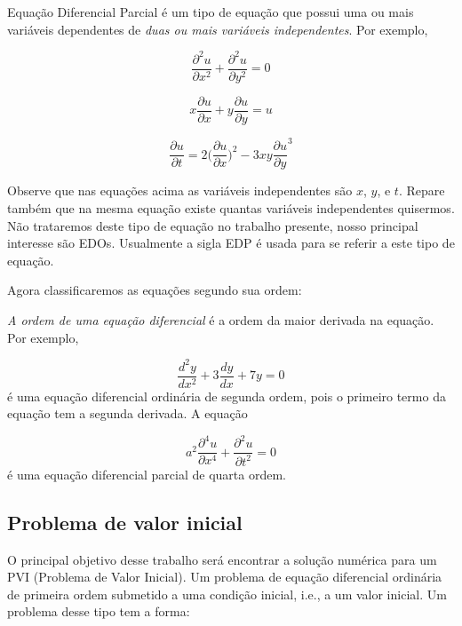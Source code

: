 Equação Diferencial Parcial é um tipo de equação que 
possui uma ou mais variáveis dependentes de 
\emph{duas ou mais variáveis independentes}. Por exemplo,

\begin{equation*}
\frac{\partial^{2}u}{\partial x^{2}} + \frac{\partial^{2}u}{\partial y^{2}} = 0
\end{equation*}


\begin{equation*}
x\frac{\partial u}{\partial x} + y\frac{\partial u}{\partial y} = u
\end{equation*}


\begin{equation*}
\frac{\partial u}{\partial t} = 2\biggl(\frac{\partial u}{\partial x}\biggl)^{2} - 3xy\frac{\partial u}{\partial y}^{3}
\end{equation*}

Observe que nas equações acima as variáveis independentes
são $x$, $y$, e $t$. Repare também que na mesma equação existe quantas variáveis
independentes quisermos. Não trataremos deste tipo de equação no trabalho presente,
nosso principal interesse são EDOs. Usualmente a sigla EDP é usada para se referir a este tipo de equação.

Agora classificaremos as equações segundo sua ordem:

\emph{A ordem de uma equação diferencial} é a ordem da maior derivada na equação. Por exemplo,

\begin{equation*}
\frac{d^{2}y}{dx^{2}} + 3\frac{dy}{dx} + 7y = 0
\end{equation*}
é uma equação diferencial ordinária de segunda ordem, pois o primeiro termo
da equação tem a segunda derivada. A equação

\begin{equation*}
a^{2}\frac{\partial^{4}u}{\partial x^{4}} + \frac{\partial^2u}{\partial t^{2}} = 0
\end{equation*}
é uma equação diferencial parcial de quarta ordem.

\subsection{Problema de valor inicial}

O principal objetivo desse trabalho será encontrar a solução numérica para um
PVI (Problema de Valor Inicial). Um problema de equação diferencial ordinária de
primeira ordem submetido a uma condição inicial, i.e., a um valor inicial. Um problema desse tipo
tem a forma:

